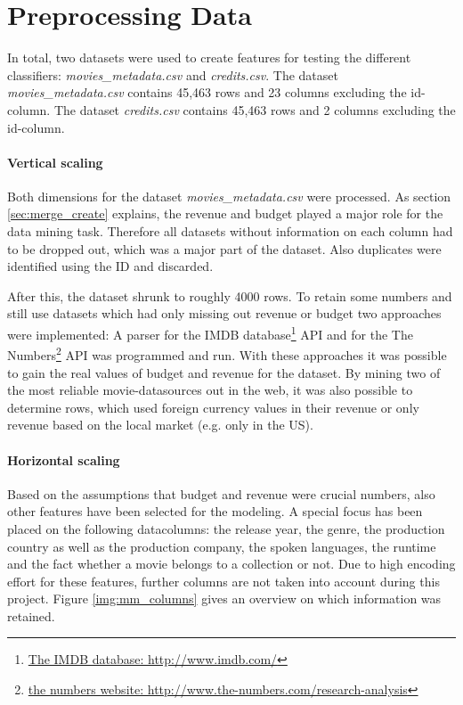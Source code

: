 \section{Preprocessing Data}
\label{cha:preprocessing}

In total, two datasets were used to create features for testing the different classifiers:
\textit{movies\_metadata.csv} and \textit{credits.csv}. The dataset \textit{movies\_metadata.csv} contains 45,463 rows and 23 columns excluding the id-column. The dataset \textit{credits.csv} contains 45,463 rows and 2 columns excluding the id-column.

\paragraph{Vertical scaling}
Both dimensions for the dataset \textit{movies\_metadata.csv} were processed. As section \ref{sec:merge_create} explains, the revenue and budget played a major role for the data mining task. Therefore all datasets without information on each column had to be dropped out, which was a major part of the dataset. Also duplicates were identified using the ID and discarded. 
 
After this, the dataset shrunk to roughly 4000 rows. To retain some numbers and still use datasets which had only missing out revenue or budget two approaches were implemented: A parser for the IMDB database\footnote{
\hyperref{http://www.imdb.com/}{external_sources}{ref:IMDB}{The IMDB database: http://www.imdb.com/}} API and for the The Numbers\footnote{\hyperref{http://www.the-numbers.com/research-analysis}{external_sources}{ref:numbers}{the numbers website: http://www.the-numbers.com/research-analysis}} API was programmed and run. With these approaches it was possible to gain the real values of budget and revenue for the dataset. By mining two of the most reliable movie-datasources out in the web, it was also possible to determine rows, which used foreign currency values in their revenue or only revenue based on the local market (e.g. only in the US).

\paragraph{Horizontal scaling}
Based on the assumptions that budget and revenue were crucial numbers, also other features have been selected for the modeling. A special focus has been placed on the following datacolumns: the release year, the genre, the production country as well as the production company, the spoken languages, the runtime and the fact whether a movie belongs to a collection or not. Due to high encoding effort for these features, further columns are not taken into account during this project. Figure \ref{img:mm_columns} gives an overview on which information was retained.

